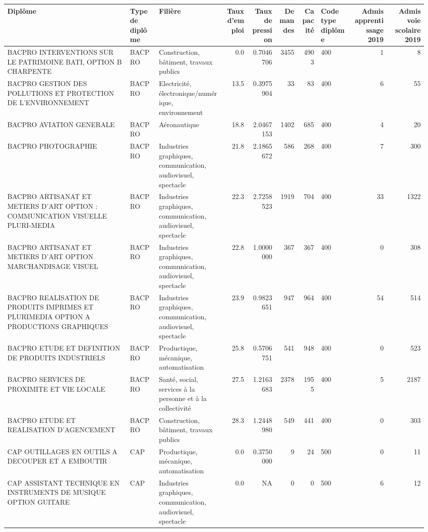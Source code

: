\documentclass[
]{book}
\begin{document}
\begin{tabular}{l|l|l|r|r|r|r|l|r|r}
\hline
Diplôme & Type de diplôme & Filière & Taux d'emploi & Taux de pression & Demandes & Capacité & Code type diplôme & Admis apprentissage 2019 & Admis voie scolaire 2019\\
\hline
BACPRO INTERVENTIONS SUR LE PATRIMOINE BATI, OPTION B CHARPENTE & BACPRO & Construction, bâtiment, travaux publics & 0.0 & 0.7046706 & 3455 & 4903 & 400 & 1 & 8\\
\hline
BACPRO GESTION DES POLLUTIONS ET PROTECTION DE L'ENVIRONNEMENT & BACPRO & Electricité, électronique/numérique, environnement & 13.5 & 0.3975904 & 33 & 83 & 400 & 6 & 55\\
\hline
BACPRO AVIATION GENERALE & BACPRO & Aéronautique & 18.8 & 2.0467153 & 1402 & 685 & 400 & 4 & 20\\
\hline
BACPRO PHOTOGRAPHIE & BACPRO & Industries graphiques, communication, audiovisuel, spectacle & 21.8 & 2.1865672 & 586 & 268 & 400 & 7 & 300\\
\hline
BACPRO ARTISANAT ET METIERS D'ART OPTION : COMMUNICATION VISUELLE PLURI-MEDIA & BACPRO & Industries graphiques, communication, audiovisuel, spectacle & 22.3 & 2.7258523 & 1919 & 704 & 400 & 33 & 1322\\
\hline
BACPRO ARTISANAT ET METIERS D'ART OPTION MARCHANDISAGE VISUEL & BACPRO & Industries graphiques, communication, audiovisuel, spectacle & 22.8 & 1.0000000 & 367 & 367 & 400 & 0 & 308\\
\hline
BACPRO REALISATION DE PRODUITS IMPRIMES ET PLURIMEDIA OPTION A PRODUCTIONS GRAPHIQUES & BACPRO & Industries graphiques, communication, audiovisuel, spectacle & 23.9 & 0.9823651 & 947 & 964 & 400 & 54 & 514\\
\hline
BACPRO ETUDE ET DEFINITION DE PRODUITS INDUSTRIELS & BACPRO & Productique, mécanique, automatisation & 25.8 & 0.5706751 & 541 & 948 & 400 & 0 & 523\\
\hline
BACPRO SERVICES DE PROXIMITE ET VIE LOCALE & BACPRO & Santé, social, services à la personne et à la collectivité & 27.5 & 1.2163683 & 2378 & 1955 & 400 & 5 & 2187\\
\hline
BACPRO ETUDE ET REALISATION D'AGENCEMENT & BACPRO & Construction, bâtiment, travaux publics & 28.3 & 1.2448980 & 549 & 441 & 400 & 0 & 303\\
\hline
CAP OUTILLAGES EN OUTILS A DECOUPER ET A EMBOUTIR & CAP & Productique, mécanique, automatisation & 0.0 & 0.3750000 & 9 & 24 & 500 & 0 & 11\\
\hline
CAP ASSISTANT TECHNIQUE EN INSTRUMENTS DE MUSIQUE OPTION GUITARE & CAP & Industries graphiques, communication, audiovisuel, spectacle & 0.0 & NA & 0 & 0 & 500 & 6 & 12\\

\end{tabular}
\end{document}
